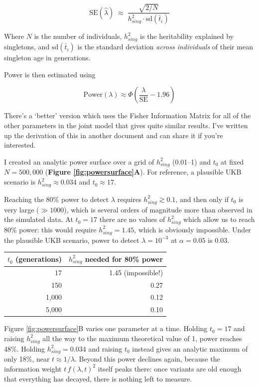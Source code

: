 \documentclass{article}
\begin{document}
$$\;\mathrm{SE}(\hat\lambda) \;\approx\; \frac{\sqrt{2/N}}{h^2_{sing} \cdot \mathrm{sd}(\bar t_i)}\;$$

Where $N$ is the number of individuals, $h^2_{sing}$ is the heritability explained by singletons, and $\mathrm{sd}(\bar t_i)$ is the standard deviation \emph{across individuals} of their mean singleton age in generations.

Power is then estimated using

\begin{equation}
    \mathrm{Power}(\lambda) \approx \Phi\!\left(\frac{\lambda}{\mathrm{SE}} - 1.96\right)
\end{equation}

There's a `better' version which uses the Fisher Information Matrix for all of the other parameters in the joint model that gives quite similar results. I've written up the derivation of this in another document and can share it if you're interested.

I created an analytic power surface over a grid of $h^2_{sing}$ (0.01--1) and $t_0$ at fixed $N = 500{,}000$ (\textbf{Figure \ref{fig:powersurface}A}). For reference, a plausible UKB scenario is $h^2_{sing} \approx 0.034$ and $t_0 \approx 17$.

Reaching the 80\% power to detect $\lambda$ requires $h^2_{sing} \gtrsim 0.1$, and then only if $t_0$ is very large ($\gg 1000$), which is several orders of magnitude more than observed in the simulated data. At $t_0 = 17$ there are no values of $h^2_{sing}$ which allow us to reach 80\% power: this would require $h^2_{sing} = 1.45$, which is obviously impossible. Under the plausible UKB scenario, power to detect $\lambda = 10^{-3}$ at $\alpha = 0.05$ is 0.03.

\begin{center}
\begin{tabular}{rr}
$t_0$ (generations) & $h^2_{sing}$ needed for 80\% power \\
\hline
17     & 1.45 \quad (impossible!) \\
150    & 0.27 \\
1{,}000  & 0.12 \\
5{,}000  & 0.10 \\
\end{tabular}
\end{center}

Figure \ref{fig:powersurface}B varies one parameter at a time. Holding $t_0 = 17$ and raising $h^2_{sing}$ all the way to the maximum theoretical value of 1, power reaches 48\%. Holding $h^2_{sing} = 0.034$ and raising $t_0$ instead gives an analytic maximum of only 18\%, near $t \approx 1/\lambda$. Beyond this power declines again, because the information weight $t\,f(\lambda,t)^2$ itself peaks there: once variants are old enough that everything has decayed, there is nothing left to measure.
\end{document}
